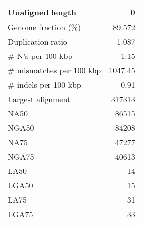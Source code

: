 \documentclass[12pt,a4paper]{article}
\begin{document}
\begin{table}[ht]
\begin{center}
\begin{tabular}{|l*{1}{|r}|}
Unaligned length & 0 \\ \hline
Genome fraction (\%) & 89.572 \\ \hline
Duplication ratio & 1.087 \\ \hline
\# N's per 100 kbp & 1.15 \\ \hline
\# mismatches per 100 kbp & 1047.45 \\ \hline
\# indels per 100 kbp & 0.91 \\ \hline
Largest alignment & 317313 \\ \hline
NA50 & 86515 \\ \hline
NGA50 & 84208 \\ \hline
NA75 & 47277 \\ \hline
NGA75 & 40613 \\ \hline
LA50 & 14 \\ \hline
LGA50 & 15 \\ \hline
LA75 & 31 \\ \hline
LGA75 & 33 \\ \hline
\end{tabular}
\end{center}
\end{table}
\end{document}

